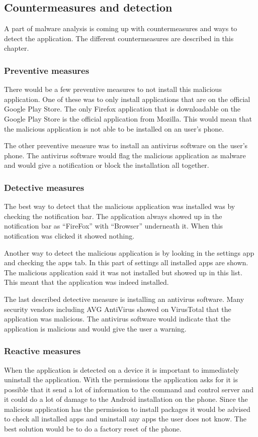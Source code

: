 \subsection{Countermeasures and detection}
A part of malware analysis is coming up with countermeasures and ways to detect the application. The different countermeasures are described in this chapter.

\subsubsection{Preventive measures}
There would be a few preventive measures to not install this malicious application. One of these was to only install applications that are on the official Google Play Store. The only Firefox application that is downloadable on the Google Play Store is the official application from Mozilla. This would mean that the malicious application is not able to be installed on an user’s phone.

The other preventive measure was to install an antivirus software on the user’s phone. The antivirus software would flag the malicious application as malware and would give a notification or block the installation all together.

\subsubsection{Detective measures}
The best way to detect that the malicious application was installed was by checking the notification bar. The application always showed up in the notification bar as “FireFox” with “Browser” underneath it. When this notification was clicked it showed nothing. 

Another way to detect the malicious application is by looking in the settings app and checking the apps tab. In this part of settings all installed apps are shown. The malicious application said it was not installed but showed up in this list. This meant that the application was indeed installed.  

The last described detective measure is installing an antivirus software. Many security vendors including AVG AntiVirus showed on VirusTotal that the application was malicious. The antivirus software would indicate that the application is malicious and would give the user a warning.

\subsubsection{Reactive measures}
When the application is detected on a device it is important to immediately uninstall the application. With the permissions the application asks for it is possible that it send a lot of information to the command and control server and it could do a lot of damage to the Android installation on the phone. Since the malicious application has the permission to install packages it would be advised to check all installed apps and uninstall any apps the user does not know. The best solution would be to do a factory reset of the phone.


